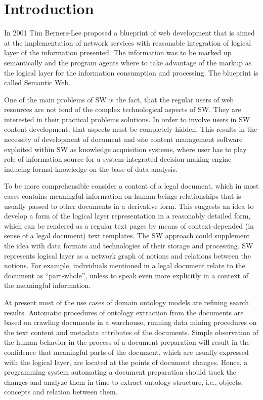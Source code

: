 \documentclass[conference]{IEEEtran}
\begin{document}
\section{Introduction}
In 2001 Tim Berners-Lee proposed a blueprint \cite{TBL2001} of web
development that is aimed at the implementation of network services
with reasonable integration of logical layer of the information
presented.  The information was to be marked up semantically and the
program agents where to take advantage of the markup as the logical
layer for the information consumption and processing.  The blueprint
is called Semantic Web.

One of the main problems of SW is the fact, that the regular users of
web resources are not fond of the complex technological aspects of SW.
They are interested in their practical problems solutions.  In order
to involve users in SW content development, that aspects must be
completely hidden.  This results in the necessity of development of
document and site content management software exploited within SW as
knowledge acquisition systems, where user has to play role of
information source for a system-integrated decision-making engine
inducing formal knowledge on the base of data analysis.

To be more comprehensible consider a content of a legal document,
which in most cases contains meaningful information on human beings
relationships that is usually passed to other documents in a
derivative form.  This suggests an idea to develop a form of the
logical layer representation in a reasonably detailed form, which can
be rendered as a regular text pages by means of context-depended (in
sense of a legal document) text templates.  The SW approach could
supplement the idea with data formats and technologies of their
storage and processing.  SW represents logical layer as a network graph
of notions and relations between the notions.  For example, individuals
mentioned in a legal document relate to the document as
“part-whole”, unless to speak even more explicitly in a context of
the meaningful information.

At present most of the use cases of domain ontology models are
refining search results.  Automatic procedures of ontology extraction
from the documents are based on crawling documents in a warehouse,
running data mining procedures on the text content and metadata
attributes of the documents.  Simple observation of the human behavior
in the process of a document preparation will result in the confidence
that meaningful parts of the document, which are usually expressed
with the logical layer, are located at the points of document changes.
Hence, a programming system automating a document preparation should
track the changes and analyze them in time to extract ontology structure,
i.e., objects, concepts and relation between them.
\end{document}
